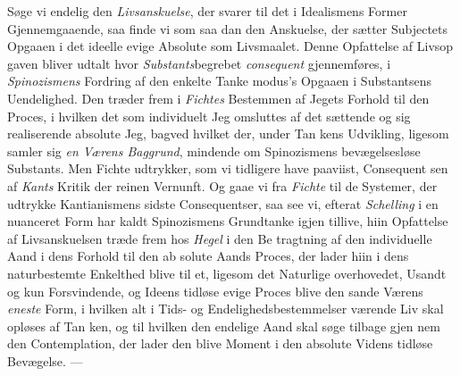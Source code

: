 Søge vi endelig den \emph{Livsanskuelse}, der svarer til det
i Idealismens Former Gjennemgaaende, saa finde vi som saa\-%
dan den Anskuelse, der sætter Subjectets Opgaaen i det ideelle
evige Absolute som Livsmaalet. Denne Opfattelse af Livsop\-%
gaven bliver udtalt hvor \emph{Substants}begrebet \emph{consequent}
gjennemføres, i \emph{Spinozismens} Fordring af den enkelte Tanke\-%
modus's Opgaaen i Substantsens Uendelighed. Den træder frem
i \emph{Fichtes} Bestemmen af Jegets Forhold til den Proces, i
hvilken det som individuelt Jeg omsluttes af det sættende og
sig realiserende absolute Jeg, bagved hvilket der, under Tan\-%
kens Udvikling, ligesom samler sig \emph{en Værens Baggrund},
mindende om Spinozismens bevægelsesløse Substants. Men
Fichte udtrykker, som vi tidligere have paaviist, Consequent\-%
sen af \emph{Kants} Kritik der reinen Vernunft. Og gaae vi fra
\emph{Fichte} til de Systemer, der udtrykke Kantianismens sidste
Consequentser, saa see vi, efterat \emph{Schelling} i en nuanceret
Form har kaldt Spinozismens Grundtanke igjen tillive, hiin
Opfattelse af Livsanskuelsen træde frem hos \emph{Hegel} i den Be\-%
tragtning af den individuelle Aand i dens Forhold til den ab\-%
solute Aands Proces, der lader hiin i dens naturbestemte
Enkelthed blive til et, ligesom det Naturlige overhovedet,
Usandt og kun Forsvindende, og Ideens tidløse evige Proces
blive den sande Værens \emph{eneste} Form, i hvilken alt i Tids-
og Endelighedsbestemmelser værende Liv skal opløses af Tan\-%
ken, og til hvilken den endelige Aand skal søge tilbage gjen\-%
nem den Contemplation, der lader den blive Moment i den
absolute Videns tidløse Bevægelse. ---

